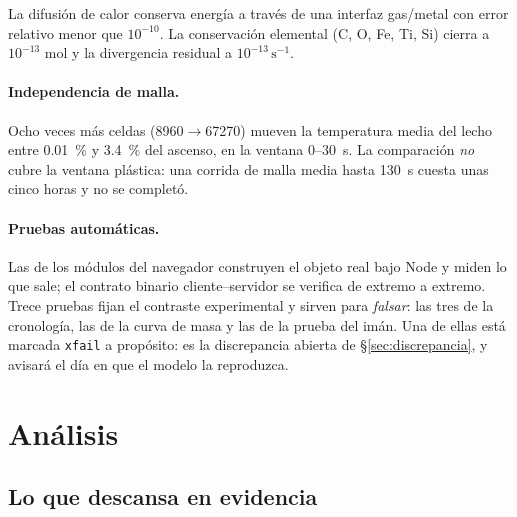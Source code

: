 \documentclass[11pt,a4paper]{article}
\begin{document}
\noindent
La difusión de calor conserva energía a través de una interfaz gas/metal con
error relativo menor que $10^{-10}$. La conservación elemental (C, O, Fe, Ti, Si)
cierra a $10^{-13}$ mol y la divergencia residual a $10^{-13}\,\mathrm{s^{-1}}$.

\paragraph{Independencia de malla.}
Ocho veces más celdas (\num{8960}$\rightarrow$\num{67270}) mueven la temperatura
media del lecho entre \qty{0.01}{\percent} y \qty{3.4}{\percent} del ascenso, en
la ventana 0--\SI{30}{\second}. La comparación \emph{no} cubre la ventana
plástica: una corrida de malla media hasta \SI{130}{\second} cuesta unas cinco
horas y no se completó.

\paragraph{Pruebas automáticas.}
 Las de los módulos del navegador construyen el objeto real bajo
Node y miden lo que sale; el contrato binario cliente--servidor se verifica de
extremo a extremo. Trece pruebas fijan el contraste experimental y sirven para
\emph{falsar}: las tres de la cronología, las de la curva de masa y las de la
prueba del imán. Una de ellas está marcada \texttt{xfail} a propósito: es la
discrepancia abierta de \S\ref{sec:discrepancia}, y avisará el día en que el
modelo la reproduzca.

\section{Análisis}

\subsection{Lo que descansa en evidencia}
\end{document}
